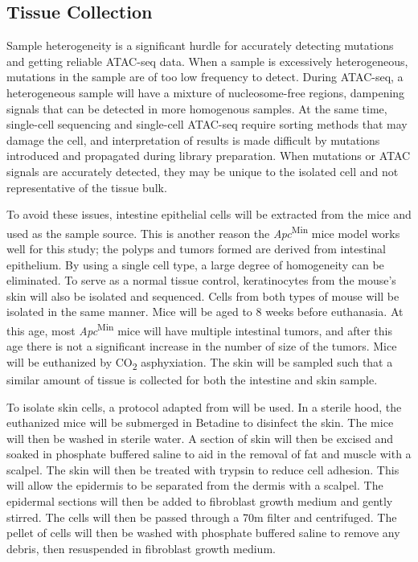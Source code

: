 \subsection{Tissue Collection}

Sample heterogeneity is a significant hurdle for accurately detecting mutations and getting reliable ATAC-seq data. When a sample is excessively heterogeneous, mutations in the sample are of too low frequency to detect. During ATAC-seq, a heterogeneous sample will have a mixture of nucleosome-free regions, dampening signals that can be detected in more homogenous samples. At the same time, single-cell sequencing and single-cell ATAC-seq require sorting methods that may damage the cell, and interpretation of results is made difficult by mutations introduced and propagated during library preparation. When mutations or ATAC signals are accurately detected, they may be unique to the isolated cell and not representative of the tissue bulk.

To avoid these issues, intestine epithelial cells will be extracted from the mice and used as the sample source. This is another reason the \textit{Apc}\textsuperscript{Min} mice model works well for this study; the polyps and tumors formed are derived from intestinal epithelium. By using a single cell type, a large degree of homogeneity can be eliminated. To serve as a normal tissue control, keratinocytes from the mouse's skin will also be isolated and sequenced. Cells from both types of mouse will be isolated in the same manner. Mice will be aged to 8 weeks before euthanasia. At this age, most \textit{Apc}\textsuperscript{Min} mice will have multiple intestinal tumors, and after this age there is not a significant increase in the number of size of the tumors. Mice will be euthanized by CO\textsubscript{2} asphyxiation. The skin will be sampled such that a similar amount of tissue is collected for both the intestine and skin sample.

To isolate skin cells, a protocol adapted from \cite{jensen_isolation_2013} will be used.
In a sterile hood, the euthanized mice will be submerged in Betadine to disinfect the skin. The mice will then be washed in sterile water. A section of skin will then be excised and soaked in phosphate buffered saline to aid in the removal of fat and muscle with a scalpel. The skin will then be treated with trypsin to reduce cell adhesion. This will allow the epidermis to be separated from the dermis with a scalpel. The epidermal sections will then be 
added to fibroblast growth medium and gently stirred. The cells will then be passed through a 70\mu m filter and centrifuged. The pellet of cells will then be washed with phosphate buffered saline to remove any debris, then resuspended in fibroblast growth medium.

